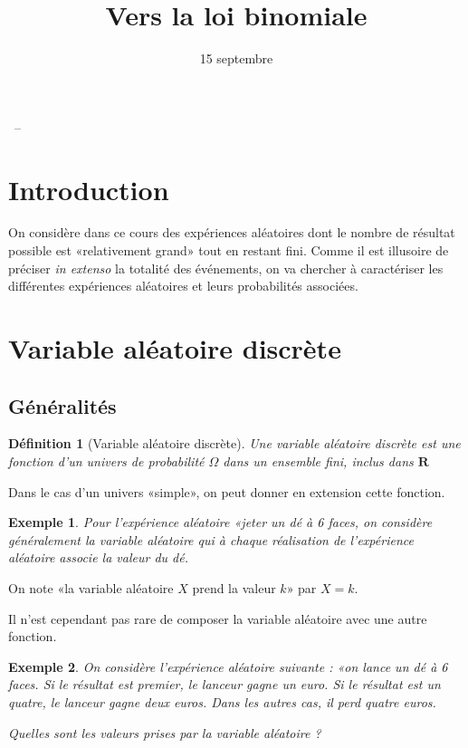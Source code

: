 \documentclass[a4ppaer,12pt,french]{article}
\title{Vers la loi binomiale}
\author{\bsc{Jumel}}
\date{15 septembre}
\makeatletter
\renewcommand{\maketitle}{%
  \begin{mdframed}\begin{center}\Large \@title ~-- \@author \\ \@date
  \normalsize \end{center} \end{mdframed}
}
\newcommand{\R}{\mathbf{R}}
\newtheorem{definition}{Définition}
\newtheorem{exemple}{Exemple}
\makeatother
\begin{document}
\maketitle

\section*{Introduction}

On considère dans ce cours des expériences aléatoires dont le nombre de
résultat possible est «relativement grand» tout en restant fini. Comme
il est illusoire de préciser \emph{in extenso} la totalité des
événements, on va chercher à caractériser les différentes expériences
aléatoires et leurs probabilités associées.

\section{Variable aléatoire discrète}

\subsection{Généralités}

\begin{definition}[Variable aléatoire discrète]
  Une variable aléatoire discrète est une \emph{fonction} d'un univers de
  probabilité $\Omega$ dans un ensemble fini, inclus dans $\R$
\end{definition}

Dans le cas d'un univers «simple», on peut donner en extension cette
fonction.
\begin{exemple}
  Pour l'expérience aléatoire «jeter un dé à 6 faces, on considère
  généralement la variable aléatoire qui à chaque réalisation de
  l'expérience aléatoire associe la valeur du dé.
\end{exemple}

On note «la variable aléatoire $X$ prend la valeur $k$» par $X = k$.

Il n'est cependant pas rare de composer la variable aléatoire avec une
autre fonction.

\begin{mdframed}
  \begin{exemple}
    On considère l'expérience aléatoire suivante : «on lance un dé à 6
    faces. Si le résultat est premier, le lanceur gagne un euro. Si le
    résultat est un quatre, le lanceur gagne deux euros. Dans les autres
    cas, il perd quatre euros.

    \emph{Quelles sont les valeurs prises par la variable aléatoire ?}
    \\[1.6cm]
  \end{exemple}
\end{mdframed}
\end{document}
